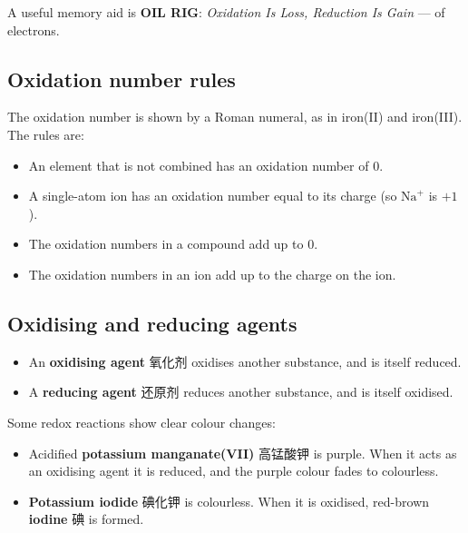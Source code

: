 \documentclass[11pt]{article}
\begin{document}
A useful memory aid is \textbf{OIL RIG}: \emph{Oxidation Is Loss, Reduction Is Gain} — of electrons.

\subsection*{Oxidation number rules}

The oxidation number is shown by a Roman numeral, as in iron(II) and iron(III). The rules are:

\begin{itemize}
\item An element that is not combined has an oxidation number of $0$.

\item A single-atom ion has an oxidation number equal to its charge (so $\text{Na}^{+}$ is $+1$).

\item The oxidation numbers in a compound add up to $0$.

\item The oxidation numbers in an ion add up to the charge on the ion.

\end{itemize}

\subsection*{Oxidising and reducing agents}

\begin{itemize}
\item An \textbf{oxidising agent} 氧化剂 oxidises another substance, and is itself reduced.

\item A \textbf{reducing agent} 还原剂 reduces another substance, and is itself oxidised.

\end{itemize}

Some redox reactions show clear colour changes:

\begin{itemize}
\item Acidified \textbf{potassium manganate(VII)} 高锰酸钾 is purple. When it acts as an oxidising agent it is reduced, and the purple colour fades to colourless.

\item \textbf{Potassium iodide} 碘化钾 is colourless. When it is oxidised, red-brown \textbf{iodine} 碘 is formed.

\end{itemize}
\end{document}
